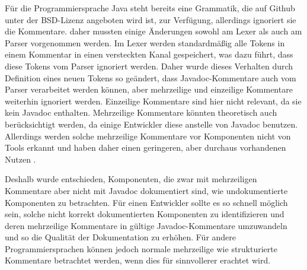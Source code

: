 Für die Programmiersprache Java steht bereits eine Grammatik, die auf Github unter der BSD-Lizenz angeboten wird ist, zur Verfügung\cite{antlr_grammar_github}, allerdings ignoriert sie die Kommentare. daher mussten einige Änderungen sowohl am Lexer als auch am Parser vorgenommen werden. Im Lexer werden standardmäßig alle Tokens in einem Kommentar in einen versteckten Kanal gespeichert, was dazu führt, dass diese Tokens vom Parser ignoriert werden. Daher wurde dieses Verhalten durch Definition eines neuen Tokens so geändert, dass Javadoc-Kommentare auch vom Parser verarbeitet werden können, aber mehrzeilige und einzeilige Kommentare weiterhin ignoriert werden. Einzeilige Kommentare sind hier nicht relevant, da sie kein Javadoc enthalten. Mehrzeilige Kommentare könnten theoretisch auch berücksichtigt werden, da einige Entwickler diese anstelle von Javadoc benutzen. Allerdings werden solche mehrzeilige Kommentare vor Komponenten nicht von Tools erkannt und haben daher einen geringeren, aber durchaus vorhandenen Nutzen \cite[S. 4]{HowDocumentationEvolvesoverTime}.

Deshalb wurde entschieden, Komponenten, die zwar mit mehrzeiligen Kommentare aber nicht mit Javadoc dokumentiert sind, wie undokumentierte Komponenten zu betrachten. Für einen Entwickler sollte es so schnell möglich sein, solche nicht korrekt dokumentierten Komponenten zu identifizieren und deren mehrzeilige Kommentare in gültige Javadoc-Kommentare umzuwandeln und so die Qualität der Dokumentation zu erhöhen. Für andere Programmiersprachen können jedoch normale mehrzeilige wie strukturierte Kommentare betrachtet werden, wenn dies für sinnvollerer erachtet wird.

